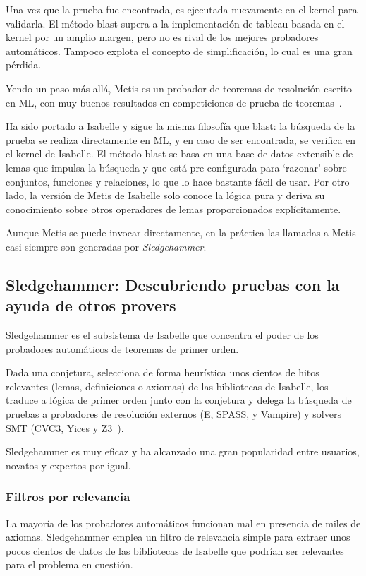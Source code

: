 \documentclass[12pt]{book}
\begin{document}
Una vez que la prueba fue encontrada, es ejecutada nuevamente en el kernel para validarla. El método blast supera a la implementación de tableau basada en el kernel por un amplio margen, pero no es rival de los mejores probadores automáticos. Tampoco explota el concepto de simplificación, lo cual es una gran pérdida.

Yendo un paso más allá, Metis es un probador de teoremas de resolución escrito en ML, con muy buenos resultados en competiciones de prueba de teoremas~\cite{CASC_competition}.

Ha sido portado a Isabelle y sigue la misma filosofía que blast: la búsqueda de la prueba se realiza directamente en ML, y en caso de ser encontrada, se verifica en el kernel de Isabelle.
El método blast se basa en una base de datos extensible de lemas que impulsa la búsqueda y que está pre-configurada para `razonar' sobre conjuntos, funciones y relaciones, lo que lo hace bastante fácil de usar. Por otro lado, la versión de Metis de Isabelle solo conoce la lógica pura y deriva su conocimiento sobre otros operadores de lemas proporcionados explícitamente.

Aunque Metis se puede invocar directamente, en la práctica las llamadas a Metis casi siempre son generadas por \textit{Sledgehammer}.


\subsection{Sledgehammer: Descubriendo pruebas con la ayuda de otros provers}\label{sec:Sledgehammer}

Sledgehammer es el subsistema de Isabelle que concentra el poder de los probadores automáticos de teoremas de primer orden.

Dada una conjetura, selecciona de forma heurística unos cientos de hitos relevantes (lemas, definiciones o axiomas) de las bibliotecas de Isabelle, los traduce a lógica de primer orden junto con la conjetura y delega la búsqueda de pruebas a probadores de resolución externos (E, SPASS, y Vampire) y solvers SMT (CVC3, Yices y Z3~\cite{Z3}).

Sledgehammer es muy eficaz y ha alcanzado una gran popularidad entre usuarios, novatos y expertos por igual.

\subsubsection{Filtros por relevancia}

La mayoría de los probadores automáticos funcionan mal en presencia de miles de axiomas. Sledgehammer emplea un filtro de relevancia simple para extraer unos pocos cientos de datos de las bibliotecas de Isabelle que podrían ser relevantes para el problema en cuestión.
\end{document}
